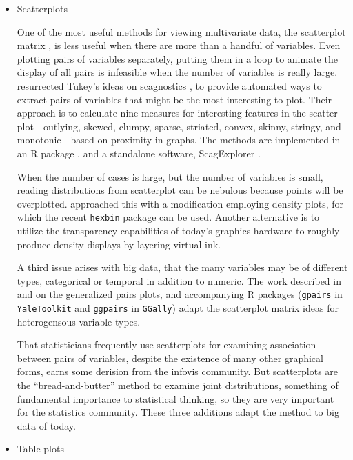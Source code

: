 \documentclass{article}
\begin{document}
\begin{itemize}
\item Scatterplots

One of the most useful methods for viewing multivariate data, the scatterplot matrix \citep{scatmat}, is less useful when there are more than a handful of variables. Even plotting pairs of variables separately, putting them in a loop to animate the display of all pairs is infeasible when the number of variables is really large.  \citet{wilkinson2005graph} resurrected Tukey's ideas on scagnostics \citep{TukeyTukey1985}, to provide automated ways to extract pairs of variables that might be the most interesting to plot. Their approach is to calculate nine measures for interesting features in the scatter plot - outlying, skewed, clumpy, sparse, striated, convex, skinny, stringy, and monotonic - based on proximity in graphs. The methods are implemented in an R package \citet{wilkinson2014package}, and a standalone software, ScagExplorer \citep{dang2014scagexplorer}. 

When the number of cases is large, but the number of variables is small, reading distributions from scatterplot can be nebulous because points will be overplotted. \citet{carr-scatmat} approached this with a modification employing density plots, for which the recent {\tt hexbin} \citep{carr2010hexbin} package can be used. Another alternative is to utilize the transparency capabilities of today's graphics hardware to roughly produce density displays by layering virtual ink.

A third issue arises with big data, that the many variables may be of different types, categorical or temporal in addition to numeric. The work described in \citet{emerson2013generalized} and \citet{friendly2014comment} on the generalized pairs plots, and accompanying R packages ({\tt gpairs} in {\tt YaleToolkit} and {\tt ggpairs} in {\tt GGally}) adapt the scatterplot matrix ideas for heterogensous variable types. 

That statisticians frequently use scatterplots for examining association between pairs of variables, despite the existence of many other graphical forms, earns some derision from the infovis community. But scatterplots are the ``bread-and-butter'' method to examine joint distributions, something of fundamental importance to statistical thinking, so they are very important for the statistics community. These three additions adapt the method to big data of today.

\item Table plots


\end{itemize}
\end{document}
